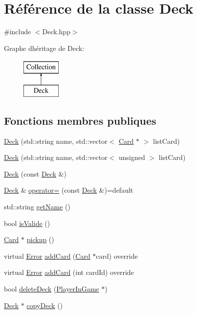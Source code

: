 \hypertarget{classDeck}{}\section{Référence de la classe Deck}
\label{classDeck}


{\ttfamily \#include $<$Deck.\+hpp$>$}

Graphe d\textquotesingle{}héritage de Deck\+:\begin{figure}[H]
\begin{center}
\leavevmode
\includegraphics[height=2.000000cm]{classDeck}
\end{center}
\end{figure}
\subsection*{Fonctions membres publiques}
\begin{DoxyCompactItemize}
\item 
\hyperlink{classDeck_ab7f2fc685f721ab93884d04826db1de0}{Deck} (std\+::string name, std\+::vector$<$ \hyperlink{classCard}{Card} $\ast$ $>$ list\+Card)
\item 
\hyperlink{classDeck_a34d860bcef590d58850606102623da07}{Deck} (std\+::string name, std\+::vector$<$ unsigned $>$ list\+Card)
\item 
\hyperlink{classDeck_a11233381fd5ea0b0b4e6288048f146fa}{Deck} (const \hyperlink{classDeck}{Deck} \&)
\item 
\hyperlink{classDeck}{Deck} \& \hyperlink{classDeck_ac3d2eaa856438ec34f898821e7e76a6d}{operator=} (const \hyperlink{classDeck}{Deck} \&)=default
\item 
std\+::string \hyperlink{classDeck_aaa3db432259e3fd24431e0cef7a83ec0}{get\+Name} ()
\item 
bool \hyperlink{classDeck_a66cfb2d1adfb6b0b94ed25c8f5ca29f9}{is\+Valide} ()
\item 
\hyperlink{classCard}{Card} $\ast$ \hyperlink{classDeck_a910d3c6c7a83168fd7f2485778d5bfe0}{pickup} ()
\item 
virtual \hyperlink{Error_8hpp_a2c3e4bb40f36b262a5214e2da2bca9c5}{Error} \hyperlink{classDeck_a741aa3330dc4912beb69c962e74df507}{add\+Card} (\hyperlink{classCard}{Card} $\ast$card) override
\item 
virtual \hyperlink{Error_8hpp_a2c3e4bb40f36b262a5214e2da2bca9c5}{Error} \hyperlink{classDeck_a5c18872420a1969dba61ee3eca320aa7}{add\+Card} (int card\+Id) override
\item 
bool \hyperlink{classDeck_a360cf67965cd28b8bdda3ec932ae3296}{delete\+Deck} (\hyperlink{classPlayerInGame}{Player\+In\+Game} $\ast$)
\item 
\hyperlink{classDeck}{Deck} $\ast$ \hyperlink{classDeck_ab216a347587d7afe42adecb58a42fcbb}{copy\+Deck} ()
\end{DoxyCompactItemize}
